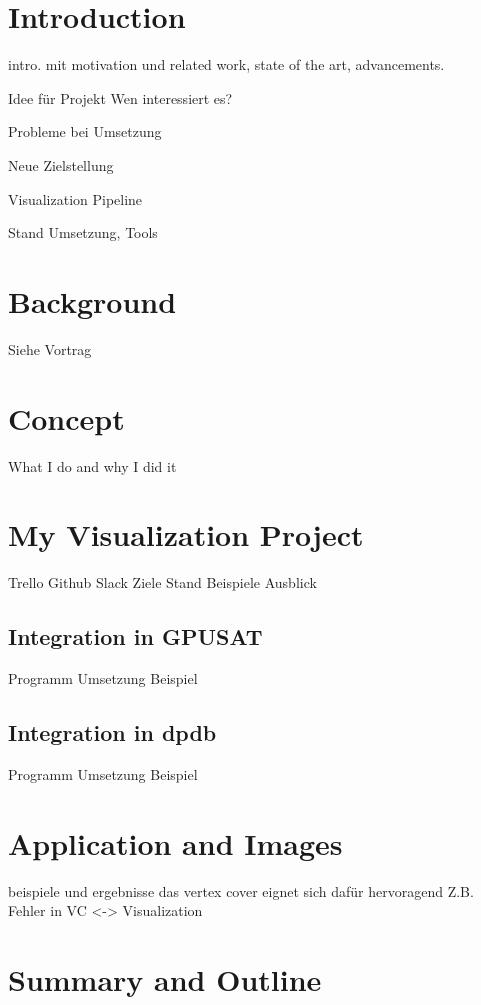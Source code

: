 \documentclass[a4paper, 12pt]{scrartcl}
\begin{document}
\section{Introduction}
intro. mit motivation und related work, state of the art, advancements.

Idee für Projekt 
Wen interessiert es?

Probleme bei Umsetzung

Neue Zielstellung

Visualization Pipeline

Stand Umsetzung, Tools

\newpage
\section{Background}
Siehe Vortrag
\newpage
\section{Concept}
What I do and why I did it
\newpage
\section{My Visualization Project}
Trello
Github
Slack
Ziele
Stand 
Beispiele
Ausblick
\newpage
\subsection{Integration in GPUSAT}
Programm
Umsetzung
Beispiel
\newpage
\subsection{Integration in dpdb}
Programm
Umsetzung
Beispiel
\newpage
\section{Application and Images }
beispiele und ergebnisse das vertex cover eignet sich dafür hervoragend
Z.B. Fehler in VC <-> Visualization
\newpage
\section{Summary and Outline}

{}

\end{document}
